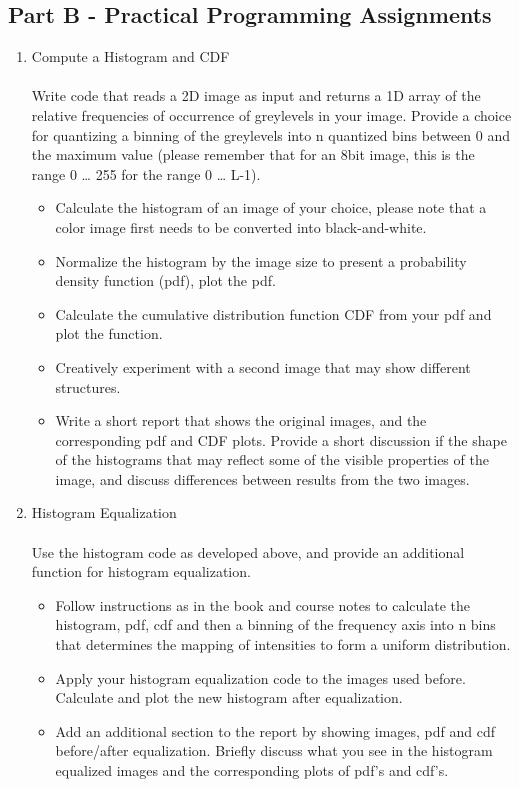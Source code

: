 \documentclass{article}
\begin{document}
\subsection{Part B - Practical Programming Assignments}
\begin{enumerate}[label=B\arabic*)]
	\item Compute a Histogram and CDF 
		\\
		\\
		Write code that reads a 2D image as input and returns a 1D array of the relative frequencies of occurrence of greylevels in your image. Provide a choice for quantizing a binning of the greylevels into n quantized bins between 0 and the maximum value (please remember that for an 8bit image, this is the range 0 … 255 for the range 0 … L-1).
		\begin{itemize}
			\item Calculate the histogram of an image of your choice, please note that a color image first needs to be converted into black-and-white.
			\item Normalize the histogram by the image size to present a probability density function (pdf), plot the pdf.
			\item Calculate the cumulative distribution function CDF from your pdf and plot the function.
			\item Creatively experiment with a second image that may show different structures.
			\item Write a short report that shows the original images, and the corresponding pdf and CDF plots. Provide a short discussion if the shape of the histograms that may reflect some of the visible properties of the image, and discuss differences between results from the two images.
		\end{itemize}

		
	\item Histogram Equalization 
		\\
		\\
		Use the histogram code as developed above, and provide an additional function for histogram equalization.
		\begin{itemize}
			\item Follow instructions as in the book and course notes to calculate the histogram, pdf, cdf and then a binning of the frequency axis into n bins that determines the mapping of intensities to form a uniform distribution.
			\item Apply your histogram equalization code to the images used before. Calculate and plot the new histogram after equalization.
			\item Add an additional section to the report by showing images, pdf and cdf before/after equalization. Briefly discuss what you see in the histogram equalized images and the corresponding plots of pdf's and cdf's.
		\end{itemize}
		

\end{enumerate}
\end{document}
